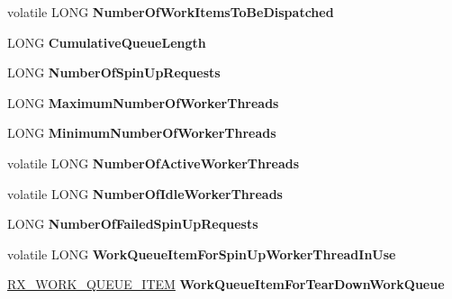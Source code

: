 \begin{DoxyCompactItemize}
volatile L\+O\+NG {\bfseries Number\+Of\+Work\+Items\+To\+Be\+Dispatched}
\item 
\mbox{\label{struct___r_x___w_o_r_k___q_u_e_u_e___adc7a9f72b1bb32a1a204511b687a49a4}} 
L\+O\+NG {\bfseries Cumulative\+Queue\+Length}
\item 
\mbox{\label{struct___r_x___w_o_r_k___q_u_e_u_e___a31f5eaff5f0e321cea591b103c7fd801}} 
L\+O\+NG {\bfseries Number\+Of\+Spin\+Up\+Requests}
\item 
\mbox{\label{struct___r_x___w_o_r_k___q_u_e_u_e___a217db3a913da2dd66912258bce24f3dc}} 
L\+O\+NG {\bfseries Maximum\+Number\+Of\+Worker\+Threads}
\item 
\mbox{\label{struct___r_x___w_o_r_k___q_u_e_u_e___a5abfbedb9120c7e190bc8745e8c26023}} 
L\+O\+NG {\bfseries Minimum\+Number\+Of\+Worker\+Threads}
\item 
\mbox{\label{struct___r_x___w_o_r_k___q_u_e_u_e___a99a6d14c091c5c7f95c03eb56176659a}} 
volatile L\+O\+NG {\bfseries Number\+Of\+Active\+Worker\+Threads}
\item 
\mbox{\label{struct___r_x___w_o_r_k___q_u_e_u_e___a5c73d4dd3f751014c1b22253229c6648}} 
volatile L\+O\+NG {\bfseries Number\+Of\+Idle\+Worker\+Threads}
\item 
\mbox{\label{struct___r_x___w_o_r_k___q_u_e_u_e___aa11d8791db917435d9aa66a301edcf8f}} 
L\+O\+NG {\bfseries Number\+Of\+Failed\+Spin\+Up\+Requests}
\item 
\mbox{\label{struct___r_x___w_o_r_k___q_u_e_u_e___a1870875b09f7ac043d988f280177f0f4}} 
volatile L\+O\+NG {\bfseries Work\+Queue\+Item\+For\+Spin\+Up\+Worker\+Thread\+In\+Use}
\item 
\mbox{\label{struct___r_x___w_o_r_k___q_u_e_u_e___ab1045827f197f1e0d0fdfea553c58f24}} 
\hyperlink{struct___r_x___w_o_r_k___q_u_e_u_e___i_t_e_m__}{R\+X\+\_\+\+W\+O\+R\+K\+\_\+\+Q\+U\+E\+U\+E\+\_\+\+I\+T\+EM} {\bfseries Work\+Queue\+Item\+For\+Tear\+Down\+Work\+Queue}

\end{DoxyCompactItemize}
